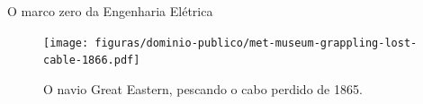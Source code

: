 \documentclass[aspectratio=169]{beamer}
\begin{document}
\begin{frame}{O marco zero da Engenharia Elétrica}
\begin{figure}
	\texttt{[image: figuras/dominio-publico/met-museum-grappling-lost-cable-1866.pdf]}
	\caption{O navio Great Eastern, pescando o cabo perdido de 1865.}
\end{figure}
\end{frame}




\end{document}
